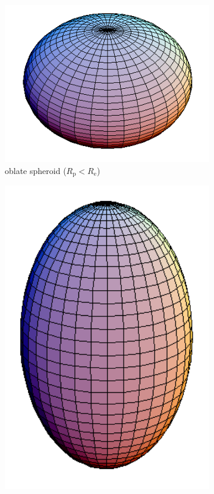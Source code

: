 \begin{figure}[htb]
\begin{subfigure}[b]{.48\textwidth}
   \centering
   \includegraphics[width=1\textwidth]{../images/form_factor/Ellipsoid/OblateSpheroid.png}
   \caption{oblate spheroid ($R_\mathrm{p} < R_\mathrm{e} $)}
   \label{fig:oblateSpheroid}
\end{subfigure}
\hfill
\begin{subfigure}[b]{.48\textwidth}
   \centering
   \includegraphics[width=1\textwidth]{../images/form_factor/Ellipsoid/ProlateSpheroid.png}

\end{subfigure}
\end{figure}
